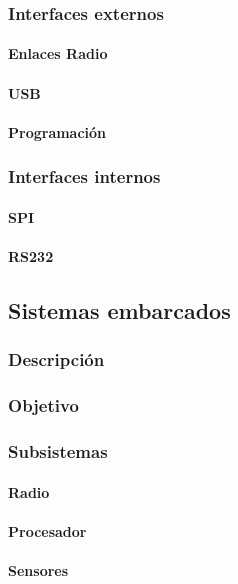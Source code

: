 \documentclass[10pt]{article}
\begin{document}
		\subsubsection{Interfaces externos}
			\paragraph{Enlaces Radio}
			\paragraph{USB}
			\paragraph{Programación}
		\subsubsection{Interfaces internos}
			\paragraph{SPI}
			\paragraph{RS232}
	\subsection{Sistemas embarcados}
		\subsubsection{Descripción}
		\subsubsection{Objetivo}
		\subsubsection{Subsistemas}
			\paragraph{Radio}
			\paragraph{Procesador}
			\paragraph{Sensores}
\end{document}
